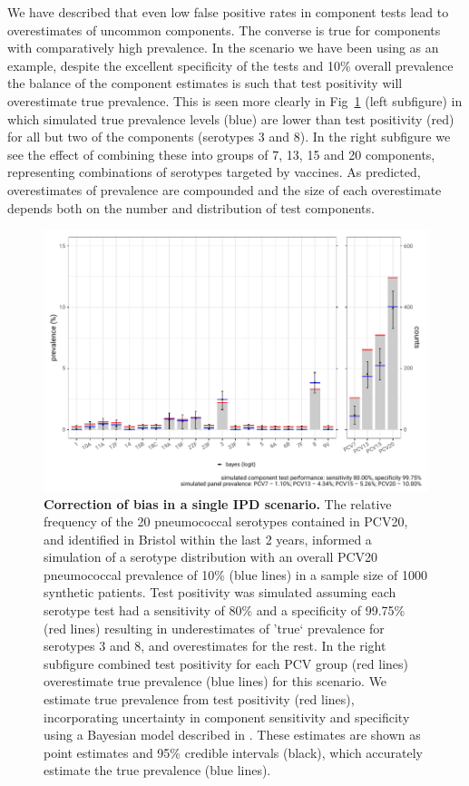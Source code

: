 \documentclass[10pt,letterpaper]{article}
\begin{document}
We have described that even low false positive rates in component tests lead to overestimates of uncommon components. The converse is true for components with comparatively high prevalence. In the scenario we have been using as an example, despite the excellent specificity of the tests and 10\% overall prevalence the balance of the component estimates is such that test positivity will overestimate true prevalence. This is seen more clearly in Fig~\ref{fig5} (left subfigure) in which simulated true prevalence levels (blue) are lower than test positivity (red) for all but two of the components (serotypes 3 and 8). In the right subfigure we see the effect of combining these into groups of 7, 13, 15 and 20 components, representing combinations of serotypes targeted by vaccines. As predicted, overestimates of prevalence are compounded and the size of each overestimate depends both on the number and distribution of test components.

\begin{figure}[h!]
\centerline{\includegraphics[width = \textwidth]{fig/simulation_result_bayes_v2.pdf}}
\caption{{\bf Correction of bias in a single IPD scenario.}
The relative frequency of the 20 pneumococcal serotypes contained in PCV20, and identified in Bristol within the last 2 years, informed a simulation of a serotype distribution with an overall PCV20 pneumococcal prevalence of 10\% (blue lines) in a sample size of 1000 synthetic patients. Test positivity was simulated assuming each serotype test had a sensitivity of 80\% and a specificity of 99.75\% (red lines) resulting in underestimates of 'true` prevalence for serotypes 3 and 8, and overestimates for the rest. In the right subfigure combined test positivity for each PCV group (red lines) overestimate true prevalence (blue lines) for this scenario. We estimate true prevalence from test positivity (red lines), incorporating uncertainty in component sensitivity and specificity using a Bayesian model described in . These estimates are shown as point estimates and 95\% credible intervals (black), which accurately estimate the true prevalence (blue lines).}
\label{fig5}
\end{figure}
\end{document}
